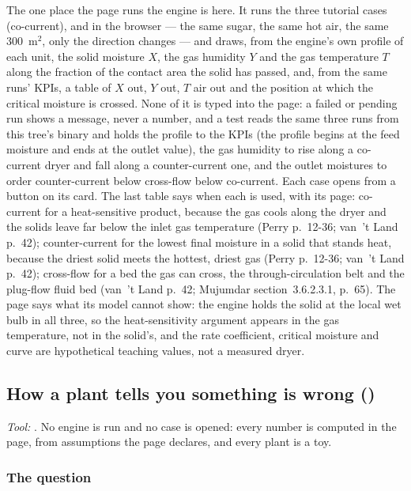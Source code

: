 \documentclass[11pt,a4paper]{article}
\begin{document}
The one place the page runs the engine is here.  It runs the three tutorial
cases  (co-current), 
and  in the browser --- the same sugar, the
same hot air, the same 300~m$^2$, only the direction changes --- and draws, from
the engine's own profile of each unit, the solid moisture $X$, the gas humidity
$Y$ and the gas temperature $T$ along the fraction of the contact area the solid
has passed, and, from the same runs' KPIs, a table of $X$ out, $Y$ out, $T$ air
out and the position at which the critical moisture is crossed.  None of it is
typed into the page: a failed or pending run shows a message, never a number, and
a test reads the same three runs from this tree's binary and holds the
profile to the KPIs (the profile begins at the feed moisture and ends at the
outlet value), the gas humidity to rise along a co-current dryer and fall along a
counter-current one, and the outlet moistures to order counter-current below
cross-flow below co-current.  Each case opens from a button on its card.  The
last table says when each is used, with its page: co-current for a heat-sensitive
product, because the gas cools along the dryer and the solids leave far below the
inlet gas temperature (Perry p.~12-36; van~'t Land p.~42); counter-current for
the lowest final moisture in a solid that stands heat, because the driest solid
meets the hottest, driest gas (Perry p.~12-36; van~'t Land p.~42); cross-flow for
a bed the gas can cross, the through-circulation belt and the plug-flow fluid bed
(van~'t Land p.~42; Mujumdar section~3.6.2.3.1, p.~65).  The page says what its
model cannot show: the engine holds the solid at the local wet bulb in all three,
so the heat-sensitivity argument appears in the gas temperature, not in the solid's,
and the rate coefficient, critical moisture and curve are hypothetical teaching
values, not a measured dryer.

\subsection*{How a plant tells you something is wrong \quad()}\label{sec:edu-fault-diagnosis}
\textit{\small Tool:} .  No engine is run and no
case is opened: every number is computed in the page, from assumptions the
page declares, and every plant is a toy.

\subsubsection*{The question}
\end{document}
